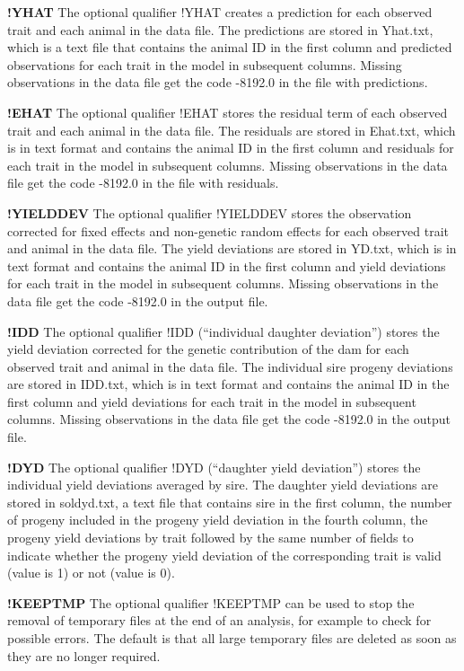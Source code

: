 \textbf{!YHAT} The optional qualifier !YHAT creates a prediction for
each observed trait and each animal in the data file. The predictions
are stored in Yhat.txt, which is a text file that contains the animal ID
in the first column and predicted observations for each trait in the
model in subsequent columns. Missing observations in the data file get
the code -8192.0 in the file with predictions.

\textbf{!EHAT} The optional qualifier !EHAT stores the residual term of
each observed trait and each animal in the data file. The residuals are
stored in Ehat.txt, which is in text format and contains the animal ID
in the first column and residuals for each trait in the model in
subsequent columns. Missing observations in the data file get the code
-8192.0 in the file with residuals.

\textbf{!YIELDDEV} The optional qualifier !YIELDDEV stores the
observation corrected for fixed effects and non-genetic random effects
for each observed trait and animal in the data file. The yield
deviations are stored in YD.txt, which is in text format and contains
the animal ID in the first column and yield deviations for each trait in
the model in subsequent columns. Missing observations in the data file
get the code -8192.0 in the output file.

\textbf{!IDD} The optional qualifier !IDD (``individual daughter
deviation'') stores the yield deviation corrected for the genetic
contribution of the dam for each observed trait and animal in the data
file. The individual sire progeny deviations are stored in IDD.txt,
which is in text format and contains the animal ID in the first column
and yield deviations for each trait in the model in subsequent columns.
Missing observations in the data file get the code -8192.0 in the output
file.

\textbf{!DYD} The optional qualifier !DYD (``daughter yield deviation'')
stores the individual yield deviations averaged by sire. The daughter
yield deviations are stored in soldyd.txt, a text file that contains
sire in the first column, the number of progeny included in the progeny
yield deviation in the fourth column, the progeny yield deviations by
trait followed by the same number of fields to indicate whether the
progeny yield deviation of the corresponding trait is valid (value is 1)
or not (value is 0).

\textbf{!KEEPTMP} The optional qualifier !KEEPTMP can be used to stop
the removal of temporary files at the end of an analysis, for example to
check for possible errors. The default is that all large temporary files
are deleted as soon as they are no longer required.

